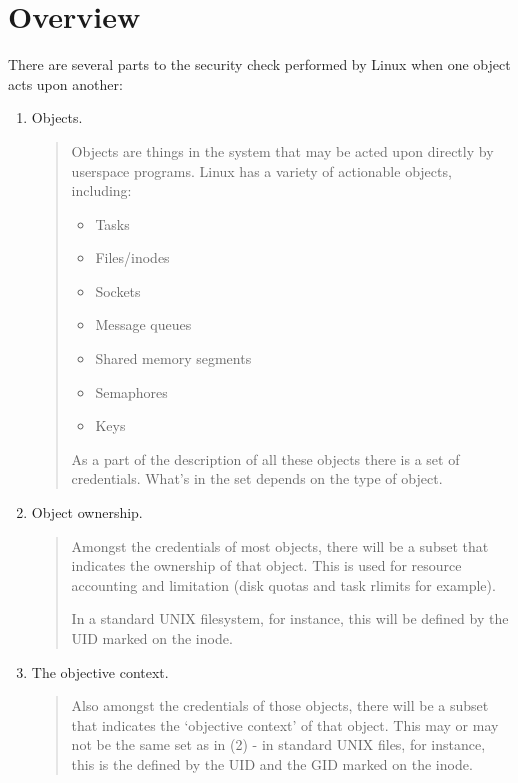 \documentclass[a4paper,8pt,english]{sphinxmanual}
\begin{document}
\section{Overview}
\label{security/credentials:overview}
There are several parts to the security check performed by Linux when one
object acts upon another:
\begin{enumerate}
\item {} 
Objects.
\begin{quote}

Objects are things in the system that may be acted upon directly by
userspace programs.  Linux has a variety of actionable objects, including:
\begin{itemize}
\item {} 
Tasks

\item {} 
Files/inodes

\item {} 
Sockets

\item {} 
Message queues

\item {} 
Shared memory segments

\item {} 
Semaphores

\item {} 
Keys

\end{itemize}

As a part of the description of all these objects there is a set of
credentials.  What's in the set depends on the type of object.
\end{quote}

\item {} 
Object ownership.
\begin{quote}

Amongst the credentials of most objects, there will be a subset that
indicates the ownership of that object.  This is used for resource
accounting and limitation (disk quotas and task rlimits for example).

In a standard UNIX filesystem, for instance, this will be defined by the
UID marked on the inode.
\end{quote}

\item {} 
The objective context.
\begin{quote}

Also amongst the credentials of those objects, there will be a subset that
indicates the `objective context' of that object.  This may or may not be
the same set as in (2) - in standard UNIX files, for instance, this is the
defined by the UID and the GID marked on the inode.


\end{quote}
\end{enumerate}
\end{document}
